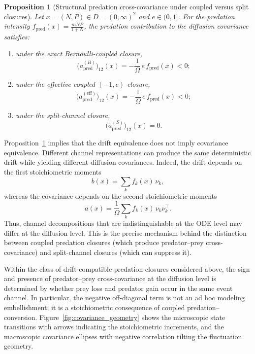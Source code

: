 \documentclass[pdflatex,sn-mathphys-ay]{sn-jnl}
\theoremstyle{thmstyleone}
\newtheorem{proposition}[theorem]{Proposition}
\theoremstyle{definition}
\theoremstyle{remark}
\begin{document}
\begin{proposition}[Structural predation cross-covariance under coupled versus split closures]
\label{prop:structural_cross_cov_paperA}
Let \(x=(N,P)\in D=(0,\infty)^2\) and \(e\in(0,1]\). For the predation intensity \(f_{\mathrm{pred}}(x)=\frac{mNP}{1+N}\), the predation contribution to the diffusion covariance satisfies:
\begin{enumerate}[label=(\roman*)]
\item under the exact Bernoulli-coupled closure,
\[
\bigl(a_{\mathrm{pred}}^{(B)}\bigr)_{12}(x)
=
-\frac{1}{\Omega}\,e\,f_{\mathrm{pred}}(x)<0;
\]
\item under the effective coupled \(({-1},e)\) closure,
\[
\bigl(a_{\mathrm{pred}}^{(\mathrm{eff})}\bigr)_{12}(x)
=
-\frac{1}{\Omega}\,e\,f_{\mathrm{pred}}(x)<0;
\]
\item under the split-channel closure,
\[
\bigl(a_{\mathrm{pred}}^{(S)}\bigr)_{12}(x)=0.
\]
\end{enumerate}
\end{proposition}

Proposition~\ref{prop:structural_cross_cov_paperA} implies that the drift equivalence does not imply covariance equivalence.
Different channel representations can produce the same deterministic drift while yielding different diffusion covariances. Indeed, the drift depends on the first stoichiometric moments
\[
b(x)=\sum_k f_k(x)\,\nu_k,
\]
whereas the covariance depends on the second stoichiometric moments
\[
a(x)=\frac{1}{\Omega}\sum_k f_k(x)\,\nu_k\nu_k^\top.
\]
Thus, channel decompositions that are indistinguishable at the ODE level may differ at the diffusion level. This is the precise mechanism behind the distinction between coupled predation closures (which produce predator--prey cross-covariance) and split-channel closures (which can suppress it).

Within the class of drift-compatible predation closures considered above, the sign and presence of predator--prey cross-covariance at the diffusion level is determined by whether prey loss and predator gain occur in the same event channel. In particular, the negative off-diagonal term is not an ad hoc modeling embellishment; it is a stoichiometric consequence of coupled predation--conversion. Figure~\ref{fig:covariance_geometry} shows the microscopic state transitions with arrows indicating the stoichiometric increments, and the macroscopic covariance ellipses with negative correlation tilting the fluctuation geometry.
\end{document}
